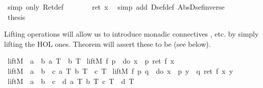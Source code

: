 \begin{isabellebody}
\ {\isacharparenleft}simp\ only{\isacharcolon}\ Ret{\isacharunderscore}def{\isacharparenright}\isanewline
\ \ \isamarkupfalse%
\ \isamarkupfalse%
\ {\isachardoublequote}{\isasymdots}\ {\isacharequal}\ ret\ x{\isachardoublequote}\ \isamarkupfalse%
\ {\isacharparenleft}simp\ add{\isacharcolon}\ Dsef{\isacharunderscore}def\ Abs{\isacharunderscore}Dsef{\isacharunderscore}inverse{\isacharparenright}\isanewline
\ \ \isamarkupfalse%
\ \isamarkupfalse%
\ {\isacharquery}thesis\ \isamarkupfalse%
\isacommand{{\isachardot}}\isanewline
\isamarkupfalse%
\isamarkupfalse%
%
\begin{isamarkuptext}%
Lifting operations will allow us to introduce monadic connectives \isa{{\isasymand}{\isacharcomma}\ {\isasymor}}, etc.
  by simply lifting the HOL ones. Theorem  will
  assert these to be  (see below).  
  \label{isa:lift-op}%
\end{isamarkuptext}%
\isamarkuptrue%
\isanewline
\ liftM\ {\isacharcolon}{\isacharcolon}\ {\isachardoublequote}{\isacharbrackleft}{\isacharprime}a\ {\isasymRightarrow}\ {\isacharprime}b{\isacharcomma}\ {\isacharprime}a\ T{\isacharbrackright}\ {\isasymRightarrow}\ {\isacharprime}b\ T{\isachardoublequote}\isanewline
\ {\isachardoublequote}liftM\ f\ p\ {\isasymequiv}\ do\ {\isacharbraceleft}x\ {\isasymleftarrow}\ p{\isacharsemicolon}\ ret\ {\isacharparenleft}f\ x{\isacharparenright}{\isacharbraceright}{\isachardoublequote}\isanewline
\ liftM{}\ {\isacharcolon}{\isacharcolon}\ {\isachardoublequote}{\isacharbrackleft}{\isacharprime}a\ {\isasymRightarrow}\ {\isacharprime}b\ {\isasymRightarrow}\ {\isacharprime}c{\isacharcomma}\ {\isacharprime}a\ T{\isacharcomma}\ {\isacharprime}b\ T{\isacharbrackright}\ {\isasymRightarrow}\ {\isacharprime}c\ T{\isachardoublequote}\isanewline
\ {\isachardoublequote}liftM{}\ f\ p\ q\ {\isasymequiv}\ do\ {\isacharbraceleft}x\ {\isasymleftarrow}\ p{\isacharsemicolon}\ y\ {\isasymleftarrow}\ q{\isacharsemicolon}\ ret\ {\isacharparenleft}f\ x\ y{\isacharparenright}{\isacharbraceright}{\isachardoublequote}\isanewline
\ liftM{}\ {\isacharcolon}{\isacharcolon}\ {\isachardoublequote}{\isacharbrackleft}{\isacharprime}a\ {\isasymRightarrow}\ {\isacharprime}b\ {\isasymRightarrow}\ {\isacharprime}c\ {\isasymRightarrow}\ {\isacharprime}d{\isacharcomma}\ {\isacharprime}a\ T{\isacharcomma}\ {\isacharprime}b\ T{\isacharcomma}\ {\isacharprime}c\ T{\isacharbrackright}\ {\isasymRightarrow}\ {\isacharprime}d\ T{\isachardoublequote}\isanewline

\end{isabellebody}
